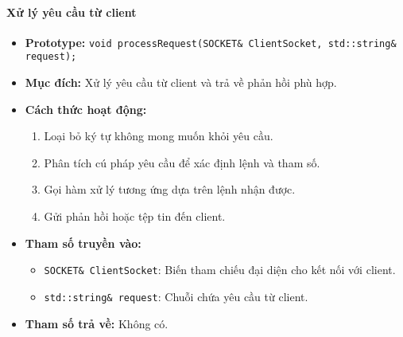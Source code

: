 \paragraph{\textbf{Xử lý yêu cầu từ client}}
\begin{itemize}
    \item \textbf{Prototype:} \texttt{void processRequest(SOCKET\& ClientSocket, std::string\& request);}
    
    \item \textbf{Mục đích:} Xử lý yêu cầu từ client và trả về phản hồi phù hợp.
    
    \item \textbf{Cách thức hoạt động:} 
    \begin{enumerate}
        \item Loại bỏ ký tự không mong muốn khỏi yêu cầu.
        \item Phân tích cú pháp yêu cầu để xác định lệnh và tham số.
        \item Gọi hàm xử lý tương ứng dựa trên lệnh nhận được.
        \item Gửi phản hồi hoặc tệp tin đến client.
    \end{enumerate}
    
    \item \textbf{Tham số truyền vào:} 
    \begin{itemize}
        \item \texttt{SOCKET\& ClientSocket}: Biến tham chiếu đại diện cho kết nối với client.
        \item \texttt{std::string\& request}: Chuỗi chứa yêu cầu từ client.
    \end{itemize}
    
    \item \textbf{Tham số trả về:} Không có.
\end{itemize}


